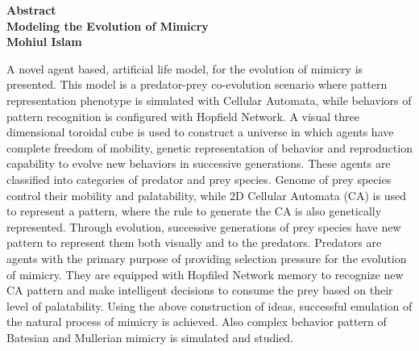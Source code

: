 \newpage
{}
\label{abstract}
\begin{center}

\Large \textbf{Abstract}\\[0.5cm]
\large \textbf{Modeling the Evolution of Mimicry}\\
\small \textbf{Mohiul Islam}\\

\end{center}

A novel agent based, artificial life model, for the evolution of mimicry is presented. This model is a predator-prey co-evolution scenario where pattern representation phenotype is simulated with Cellular Automata, while behaviors of pattern recognition is configured with Hopfield Network. A visual three dimensional toroidal cube is used to construct a universe in which agents have complete freedom of mobility, genetic representation of behavior and reproduction capability to evolve new behaviors in successive generations. These agents are classified into categories of predator and prey species. Genome of prey species control their mobility and palatability, while 2D Cellular Automata (CA) is used to represent a pattern, where the rule to generate the CA is also genetically represented. Through evolution, successive generations of prey species have new pattern to represent them both visually and to the predators. Predators are agents with the primary purpose of providing selection pressure for the evolution of mimicry. They are equipped with Hopfiled Network memory to recognize new CA pattern and make intelligent decisions to consume the prey based on their level of palatability. Using the above construction of ideas, successful emulation of the natural process of mimicry is achieved. Also complex behavior pattern of Batesian and Mullerian mimicry is simulated and studied.

\setcounter{page}{3}
